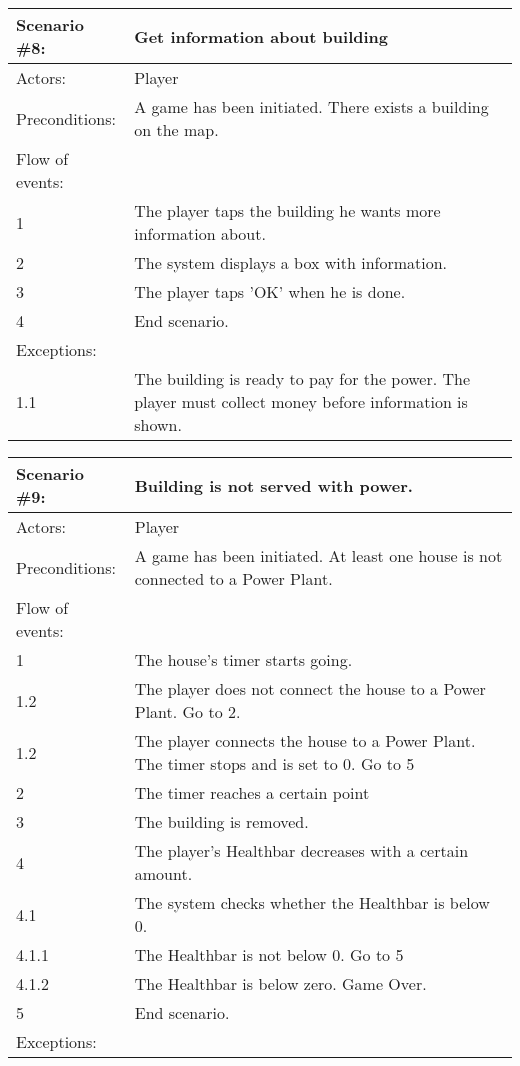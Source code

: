 \begin{tabular}{| l | p{10cm} |}
	\hline
	\rowcolor{lightgray}
	{\bf Scenario \#8:} & {\bf Get information about building} \\ \hline
	Actors: & Player \\ \hline
	Preconditions: & A game has been initiated. There exists a building on the map. \\ \hline
	Flow of events: & \\ \hline
	1 & The player taps the building he wants more information about. \\ \hline
	2 & The system displays a box with information. \\ \hline
	3 & The player taps 'OK' when he is done. \\ \hline
	4 & End scenario. \\ \hline
	Exceptions: & \\ \hline
	1.1 & The building is ready to pay for the power. The player must collect money before information is shown. \\ \hline
\end{tabular}

\begin{tabular}{| l | p{10cm} |}
	\hline
	\rowcolor{lightgray}
	{\bf Scenario \#9:} & {\bf Building is not served with power.} \\ \hline
	Actors: & Player \\ \hline
	Preconditions: & A game has been initiated. At least one house is not connected to a Power Plant. \\ \hline
	Flow of events: & \\ \hline
	1 & The house's timer starts going. \\ \hline
	1.2 & The player does not connect the house to a Power Plant. Go to 2. \\ \hline
	1.2 & The player connects the house to a Power Plant. The timer stops and is set to 0. Go to 5 \\ \hline
	2 & The timer reaches a certain point \\ \hline
	3 & The building is removed. \\ \hline
	4 & The player's Healthbar decreases with a certain amount. \\ \hline
	4.1 & The system checks whether the Healthbar is below 0. \\ \hline
	4.1.1 & The Healthbar is not below 0. Go to 5 \\ \hline
	4.1.2 & The Healthbar is below zero. Game Over. \\ \hline
	5 & End scenario. \\ \hline
	Exceptions: & \\ \hline	
\end{tabular}


